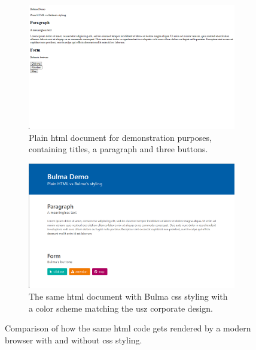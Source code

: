 \documentclass[\relativeRoot/main.tex]{subfiles}
\begin{document}
\begin{figure}
    \begin{subfigure}[b]{0.48\textwidth}
        \includegraphics[width=\textwidth, frame]{figures/demo_without_bulma.png}
        \caption[
            Plain demo HTML document
        ]{
            Plain \acrshort{html} document for demonstration purposes, containing titles, a paragraph and three buttons.
        }
        \label{fig:lyprox:plain}
    \end{subfigure}
    \hfill
    \begin{subfigure}[b]{0.48\textwidth}
        \includegraphics[width=\textwidth, frame]{figures/demo_with_bulma.png}
        \caption[
            HTML demo document with Bulma styling
        ]{
            The same \acrshort{html} document with Bulma \acrshort{css} styling with a color scheme matching the \gls{usz} corporate design.
        }
        \label{fig:lyprox:bulma}
    \end{subfigure}
    \caption[Plain HTML vs HTML plus CSS styling]{
        Comparison of how the same \acrshort{html} code gets rendered by a modern browser with and without \gls{css} styling.
    }
    \label{fig:lyprox:plain_vs_bulma}
\end{figure}
\end{document}

